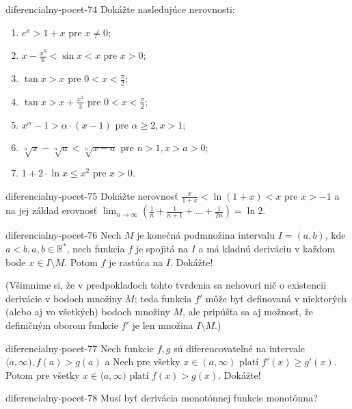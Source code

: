 \begin{defproblem}{diferencialny-pocet-74}
Dokážte nasledujúce nerovnosti:
\begin{enumerate}
\item $e^x>1+x$ pre $x\neq 0$;
\item $x-\frac{x^3}{6}<\sin x<x$ pre $x>0$;
\item $\tan x>x$ pre $0<x<\frac{\pi}{2}$;
\item $\tan x>x+\frac{x^3}{3}$ pre $0<x<\frac{\pi}{2}$;
\item $x^{\alpha}-1>\alpha\cdot(x-1)$ pre $\alpha\geq 2,x>1$;
\item $\sqrt[n]{x}-\sqrt[n]{a}<\sqrt[n]{x-a}$ pre $n>1,x>a>0$;
\item $1+2\cdot\ln x\leq x^2$ pre $x>0$.
\end{enumerate}
\end{defproblem}

\begin{defproblem}{diferencialny-pocet-75}
Dokážte nerovnosť $\frac{x}{1+x}<\ln (1+x)<x$ pre $x>-1$ a na jej základ erovnosť $\lim_{n \rightarrow \infty}(\frac{1}{n}+\frac{1}{n+1}+...+\frac{1}{2n})=\ln 2$. 
\end{defproblem}

\begin{defproblem}{diferencialny-pocet-76}
Nech $M$ je konečná podmnožina intervalu $I=(a,b)$, kde $a<b,a,b\in\mathbb{R^*}$, nech funkcia $f$ je spojitá na $I$ a má kladnú deriváciu v každom bode $x\in I \setminus M$. Potom $f$ je rastúca na $I$. Dokážte!

(Všimnime si, že v predpokladoch tohto tvrdenia sa nehovorí nič o existencii derivácie v bodoch množiny $M$; teda funkcia $f'$ môže byť definovaná v niektorých (alebo aj vo všetkých) bodoch množiny $M$, ale pripúšťa sa aj možnosť, že definičným oborom funkcie $f'$ je len množina $I \setminus M$.)
\end{defproblem}

\begin{defproblem}{diferencialny-pocet-77}
Nech funkcie $f,g$ sú diferencovateľné na intervale $\langle a,\infty),f(a)>g(a)$ a Nech pre všetky $x\in (a,\infty)$ platí $f'(x)\geq g'(x)$. Potom pre všetky $x\in \langle a,\infty)$ platí $f(x)>g(x)$. Dokážte!
\end{defproblem}

\begin{defproblem}{diferencialny-pocet-78}
Musí byť derivácia monotónnej funkcie monotónna?
\end{defproblem}

